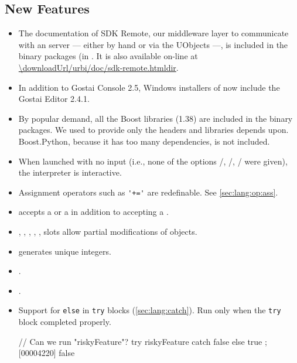 \subsection{New Features}
\begin{itemize}
\item The documentation of \urbi SDK Remote, our middleware layer to
  communicate with an \urbi server --- either by hand or via the UObjects
  ---, is included in the binary packages (in
  .  It is also
  available on-line at
  \url{\downloadUrl/urbi/doc/sdk-remote.htmldir}.

\item In addition to Gostai Console 2.5, Windows installers of \usdk now
  include the Gostai Editor 2.4.1.

\item By popular demand, all the Boost libraries (1.38) are included in the
  binary packages.  We used to provide only the headers and libraries \usdk
  depends upon.  Boost.Python, because it has too many dependencies, is not
  included.

\item When launched with no input (i.e., none of the options
  /, /,
  / were given), the interpreter is interactive.

\item Assignment operators such as \lstinline|'+='| are redefinable.  See
  \autoref{sec:lang:op:ass}.

\item {} accepts a  or a
   in addition to accepting a .

\item {}, , ,
  , , 
  slots allow partial modifications of  objects.

\item {} generates unique integers.

\item {}.

\item {}.

\item Support for \lstinline|else| in \lstinline|try| blocks
  (\autoref{sec:lang:catch}).  Run only when the \lstinline|try|
  block completed properly.
\begin{urbiscript}
// Can we run "riskyFeature"?
try { riskyFeature } catch { false } else { true };
[00004220] false


\end{urbiscript}
\end{itemize}
